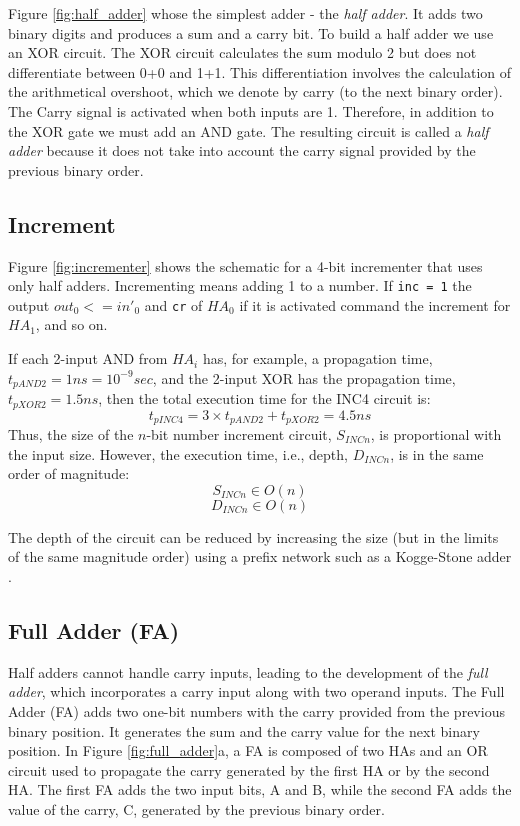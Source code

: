 Figure \ref{fig:half_adder} whose the simplest adder - the \textit{half adder}. It adds two binary digits and produces a sum and a carry bit. To build a half adder we use an XOR circuit. The XOR circuit calculates the sum modulo 2 but does not differentiate between 0+0 and 1+1. This differentiation involves the calculation of the arithmetical overshoot, which we denote by carry (to the next binary order). The Carry signal is activated when both inputs are 1. Therefore, in addition to the XOR gate we must add an AND gate. The resulting circuit is called a \textit{half adder} because it does not take into account the carry signal provided by the previous binary order.

\subsection{Increment}

Figure \ref{fig:incrementer} shows the schematic for a 4-bit incrementer that uses only half adders. Incrementing means adding 1 to a number. If {\tt inc = 1} the output $out_0 <= in'_0$  and {\tt cr} of $HA_0$ if it is activated command the increment for $HA_1$, and so on.

If each 2-input AND from $HA_i$ has, for example,  a propagation time, $t_{pAND2} = 1ns = 10^{-9}sec$, and the 2-input XOR has the propagation time, $t_{pXOR2} = 1.5ns$, then the total execution time for the INC4 circuit is:
$$t_{pINC4} = 3 \times t_{pAND2} + t_{pXOR2} = 4.5ns$$
Thus, the size of the $n$-bit number increment circuit, $S_{INCn}$, is proportional with the input size. However, the execution time, i.e., depth, $D_{INCn}$, is in the same order of magnitude:
$$S_{INCn} \in O(n)$$
$$D_{INCn} \in O(n)$$

The depth of the circuit can be reduced by increasing the size (but in the limits of the same magnitude order) using a prefix network such as a Kogge-Stone adder \cite{kogge1973parallel}.

\subsection{Full Adder (FA)}
Half adders cannot handle carry inputs, leading to the development of the \textit{full adder}, which incorporates a carry input along with two operand inputs. The Full Adder (FA) adds two one-bit numbers with the carry provided from the previous binary position. It generates the sum and the carry value for the next binary position. In Figure \ref{fig:full_adder}a, a FA is composed of two HAs and an OR circuit used to propagate the carry generated by the first HA or by the second HA. The first FA adds the two input bits, A and B, while the second FA adds the value of the carry, C, generated by the previous binary order.

